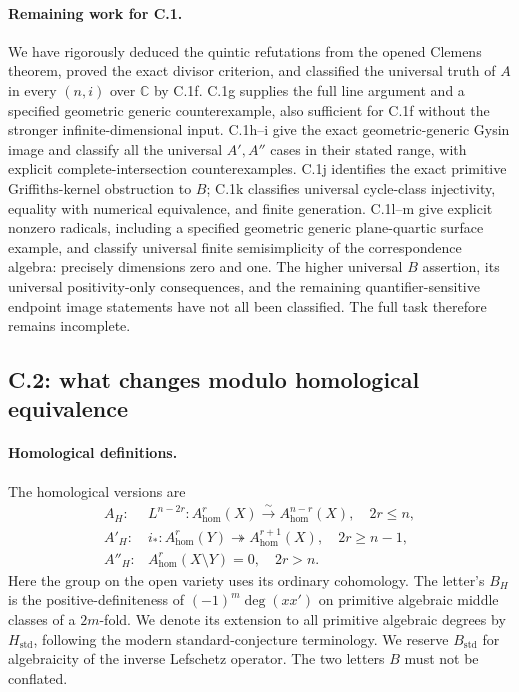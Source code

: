 \paragraph{Remaining work for C.1.}
We have rigorously deduced the quintic refutations from the opened
Clemens theorem, proved the exact divisor criterion, and classified
the universal truth of $A$ in every $(n,i)$ over $\mathbb C$ by
C.1f. C.1g supplies the full line argument and a specified geometric
generic counterexample, also sufficient for C.1f without the stronger
infinite-dimensional input. C.1h--i give the exact geometric-generic
Gysin image and classify all the universal $A',A''$ cases in their
stated range, with explicit complete-intersection counterexamples.
C.1j identifies the exact primitive Griffiths-kernel obstruction to
$B$; C.1k classifies universal cycle-class injectivity, equality
with numerical equivalence, and finite generation. C.1l--m give
explicit nonzero radicals, including a specified geometric generic
plane-quartic surface example, and classify universal finite
semisimplicity of the correspondence algebra: precisely dimensions
zero and one. The higher universal $B$ assertion, its universal
positivity-only consequences, and the remaining quantifier-sensitive
endpoint image statements have not all been classified.
The full task therefore remains incomplete.

\subsection{C.2: what changes modulo homological equivalence}

\paragraph{Homological definitions.}
The homological versions are
\[
\begin{array}{ll}
A_H:& L^{n-2r}:A^r_{\mathrm{hom}}(X)\xrightarrow{\sim}
                  A^{n-r}_{\mathrm{hom}}(X),\quad 2r\le n,\\
A'_H:&i_*:A^r_{\mathrm{hom}}(Y)\twoheadrightarrow
                  A^{r+1}_{\mathrm{hom}}(X),\quad 2r\ge n-1,\\
A''_H:&A^r_{\mathrm{hom}}(X\setminus Y)=0,\quad 2r>n.
\end{array}
\]
Here the group on the open variety uses its ordinary cohomology.
The letter's $B_H$ is the positive-definiteness of
$(-1)^m\deg(xx')$ on primitive algebraic middle classes of a
$2m$-fold. We denote its extension to all primitive algebraic degrees
by $H_{\mathrm{std}}$, following the modern standard-conjecture
terminology. We reserve $B_{\mathrm{std}}$ for algebraicity of the inverse
Lefschetz operator. The two letters $B$ must not be conflated.

